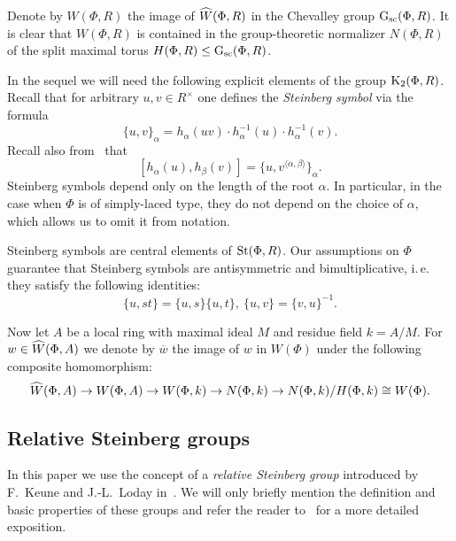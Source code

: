 Denote by $W(\Phi, R)$ the image of $\widehat{W}(\Phi, R)$ in the Chevalley group $\operatorname{G}_\mathrm{sc}(\Phi, R)$.
It is clear that $W(\Phi, R)$ is contained in the group-theoretic normalizer $N(\Phi, R)$ of the split maximal torus $H(\Phi, R) \leq \operatorname{G}_\mathrm{sc}(\Phi, R)$.

In the sequel we will need the following explicit elements of the group $\operatorname{K}_2(\Phi, R)$.
Recall that for arbitrary $u, v \in R^\times$ one defines the \textit{Steinberg symbol} via the formula
\begin{equation} \label{eq:steinberg} \{ u, v \}_\alpha = h_\alpha(uv) \cdot h_\alpha^{-1}(u) \cdot h_\alpha^{-1}(v). \end{equation}
Recall also from~\cite[Lemme~5.4]{Ma69} that
\begin{equation} \label{eq:steinberg-2} [h_\alpha(u), h_\beta(v)] = \{u, v^{\langle \alpha, \beta \rangle}\}_\alpha. \end{equation}
Steinberg symbols depend only on the length of the root $\alpha$.
In particular, in the case when $\Phi$ is of simply-laced type, they do not depend on the choice of $\alpha$, which allows us to omit it from notation.

Steinberg symbols are central elements of $\operatorname{St}(\Phi, R)$.
Our assumptions on $\Phi$ guarantee that Steinberg symbols are antisymmetric and bimultiplicative, i.\,e. they satisfy the following identities:
\begin{equation} \label{eq:symbol-properties} \{ u, st \} = \{ u, s\} \{ u, t \}, \ \{ u, v \} = \{ v, u\}^{-1}. \end{equation}

Now let $A$ be a local ring with maximal ideal $M$ and residue field $k = A/M$.
For $w \in \widehat{W}(\Phi, A)$ we denote by $\overline{w}$ the image of $w$ in $W(\Phi)$ under the following composite homomorphism:
\[ \widehat{W}(\Phi, A) \to W(\Phi, A) \to W(\Phi, k) \to N(\Phi, k) \to N(\Phi, k) / H(\Phi, k) \cong W(\Phi). \]

\subsection{Relative Steinberg groups} \label{subsec:another-presentation}
In this paper we use the concept of a \textit{relative Steinberg group} introduced by F.~Keune and J.-L.~Loday in~\cite{Ke78, Lo78}.
We will only briefly mention the definition and basic properties of these groups and refer the reader to~\cite[\S~2.3]{LS20} for a more detailed exposition.

